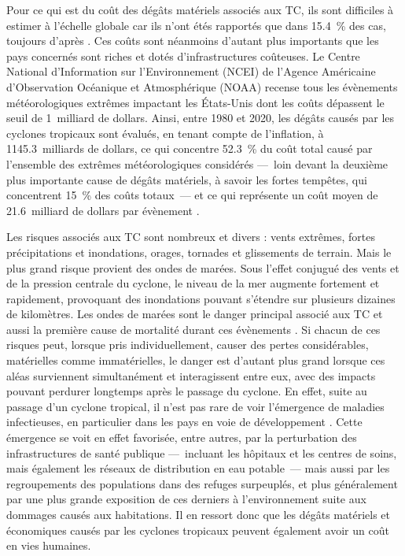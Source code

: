 \documentclass[../main.tex]{subfiles}
\begin{document}
Pour ce qui est du coût des dégâts matériels associés aux TC, ils sont difficiles à estimer à l'échelle globale car ils n'ont étés rapportés que dans
\SI{15.4}{\percent} des cas, toujours d'après \cite{doocy_human_2013}. Ces coûts sont néanmoins d'autant plus importants que les pays concernés sont riches et
dotés d'infrastructures coûteuses. Le Centre National d'Information sur l'Environnement (NCEI) de l'Agence Américaine d'Observation Océanique et Atmosphérique
(NOAA) recense tous les évènements météorologiques extrêmes impactant les États-Unis dont les coûts dépassent le seuil de \num{1}~milliard de dollars. Ainsi,
entre 1980 et 2020, les dégâts causés par les cyclones tropicaux sont évalués, en tenant compte de l'inflation, à \num{1145.3}~milliards de dollars, ce qui
concentre \SI{52.3}{\percent} du coût total causé par l'ensemble des extrêmes météorologiques considérés ---~loin devant la deuxième plus importante cause de
dégâts matériels, à savoir les fortes tempêtes, qui concentrent \SI{15}{\percent} des coûts totaux~--- et ce qui représente un coût moyen de \num{21.6}~milliard
de dollars par évènement \parencite{smith_billiondollar_2020}.

Les risques associés aux TC sont nombreux et divers : vents extrêmes, fortes précipitations et inondations, orages, tornades et glissements de terrain. Mais le
plus grand risque provient des ondes de marées. Sous l'effet conjugué des vents et de la pression centrale du cyclone, le niveau de la mer augmente fortement et
rapidement, provoquant des inondations pouvant s'étendre sur plusieurs dizaines de kilomètres. Les ondes de marées sont le danger principal associé aux TC et
aussi la première cause de mortalité durant ces évènements \parencite{needham_review_2015}. Si chacun de ces risques peut, lorsque pris individuellement, causer
des pertes considérables, matérielles comme immatérielles, le danger est d'autant plus grand lorsque ces aléas surviennent simultanément et interagissent entre
eux, avec des impacts pouvant perdurer longtemps après le passage du cyclone. En effet, suite au passage d'un cyclone tropical, il n'est pas rare de voir
l'émergence de maladies infectieuses, en particulier dans les pays en voie de développement \parencite{shultz_epidemiology_2005}. Cette émergence se voit en
effet favorisée, entre autres, par la perturbation des infrastructures de santé publique ---~incluant les hôpitaux et les centres de soins, mais également les
réseaux de distribution en eau potable~--- mais aussi par les regroupements des populations dans des refuges surpeuplés, et plus généralement par une plus
grande exposition de ces derniers à l'environnement suite aux dommages causés aux habitations. Il en ressort donc que les dégâts matériels et économiques causés
par les cyclones tropicaux peuvent également avoir un coût en vies humaines.
\end{document}
